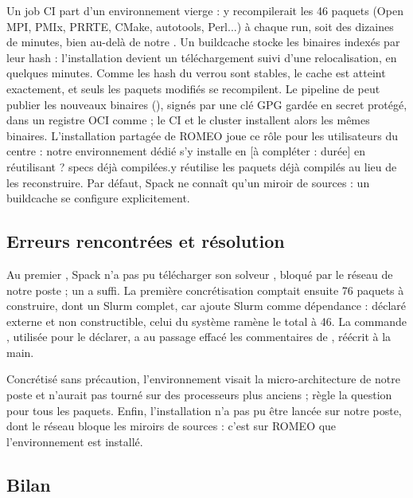 \documentclass[11pt,a4paper]{article}
\newcommand{\spackinstalltime}{\afaire{durée}}
\newcommand{\spackreuse}{?}
\newcommand{\fic}[1]{\code{#1}}
\newcommand{\afaire}[1]{\textcolor{red!70!black}{[à compléter : #1]}}
\begin{document}
{{{{{{{Un job CI part d'un environnement vierge :  y recompilerait les 46 paquets
(Open MPI, PMIx, PRRTE, CMake, autotools, Perl...) à chaque run, soit des dizaines de minutes,
bien au-delà de notre . Un buildcache stocke les binaires indexés par leur hash : l'installation
devient un téléchargement suivi d'une relocalisation, en quelques minutes. Comme les hash du
verrou sont stables, le cache est atteint exactement, et seuls les paquets modifiés se
recompilent. Le pipeline de  peut publier les nouveaux binaires
(), signés par une clé GPG gardée en secret protégé, dans un registre
OCI comme  ; le CI et le cluster installent alors les mêmes binaires.
L'installation partagée de ROMEO joue ce rôle pour les utilisateurs du centre : notre
environnement dédié \ifromeo s'y installe en \spackinstalltime{} en réutilisant \spackreuse{} specs
déjà compilées.\else y réutilise les paquets déjà compilés au lieu de les reconstruire.\fi{} Par
défaut, Spack ne connaît qu'un miroir de sources : un buildcache se configure explicitement.

\subsection{Erreurs rencontrées et résolution}

Au premier , Spack n'a pas pu télécharger son solveur , bloqué par
le réseau de notre poste ; un  a suffi. La première concrétisation
comptait ensuite 76 paquets à construire, dont un Slurm complet, car  ajoute
Slurm comme dépendance : déclaré externe et non constructible, celui du système ramène le total
à 46. La commande , utilisée pour le déclarer, a au passage effacé les
commentaires de \fic{spack.yaml}, réécrit à la main.

Concrétisé sans précaution, l'environnement visait la micro-architecture  de notre
poste et n'aurait pas tourné sur des processeurs plus anciens ;  règle
la question pour tous les paquets. Enfin, l'installation n'a pas pu être lancée sur notre poste,
dont le réseau bloque les miroirs de sources : c'est sur ROMEO que l'environnement est installé.

\subsection{Bilan}

}}}}}}}
\end{document}
